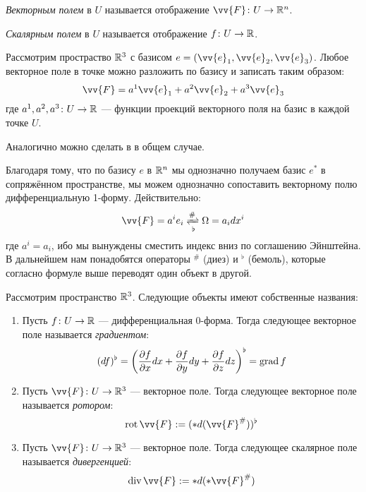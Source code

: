 \begin{definition}
	\textit{Векторным полем} в $U$ называется отображение $\vv{F} \colon U \to \R^n$.
\end{definition}

\begin{definition}
	\textit{Скалярным полем} в $U$ называется отображение $f \colon U \to \mathbb{R}$.
\end{definition}

\begin{example}
	Рассмотрим простраство $\mathbb{R}^3$ с базисом $e = (\vv{e}_1, \vv{e}_2, \vv{e}_3)$. Любое векторное поле в точке можно разложить по базису и записать таким образом:
	\[
		\vv{F} = a^1\vv{e}_1 + a^2\vv{e}_2 + a^3\vv{e}_3
	\]
	где $a^1, a^2, a^3 \colon U \to \mathbb{R}$ --- функции проекций векторного поля на базис в каждой точке $U$.
	
	Аналогично можно сделать в в общем случае.
\end{example}

\begin{note}
	Благодаря тому, что по базису $e$ в $\mathbb{R}^n$ мы однозначно получаем базис $e^*$ в сопряжённом пространстве, мы можем однозначно сопоставить векторному полю дифференциальную 1-форму. Действительно:
	\[
		\vv{F} = a^i e_i \xrightleftharpoons[\flat]{\#} \Omega = a_i dx^i
	\]
	где $a^i = a_i$, ибо мы вынуждены сместить индекс вниз по соглашению Эйнштейна. В дальнейшем нам понадобятся операторы ${}^\#$ (диез) и ${}^\flat$ (бемоль), которые согласно формуле выше переводят один объект в другой.
\end{note}

\begin{definition}
	Рассмотрим пространство $\mathbb{R}^3$. Следующие объекты имеют собственные названия:
	\begin{enumerate}
		\item Пусть $f \colon U \to \mathbb{R}$ --- дифференциальная 0-форма. Тогда следующее векторное поле называется \textit{градиентом}:
		\[
			(df)^\flat = \left(\frac{\partial f}{\partial x}dx + \frac{\partial f}{\partial y}dy + \frac{\partial f}{\partial z}dz\right)^\flat = \operatorname{grad} f
		\]
		
		\item Пусть $\vv{F} \colon U \to \R^3$ --- векторное поле. Тогда следующее векторное поле называется \textit{ротором}:
		\[
			\rot \vv{F} := (*d(\vv{F}^\#))^\flat
		\]
		
		\item Пусть $\vv{F} \colon U \to \R^3$ --- векторное поле. Тогда следующее скалярное поле называется \textit{дивергенцией}:
		\[
			\Div \vv{F} := *d(*\vv{F}^\#)
		\]
	\end{enumerate}
\end{definition}

